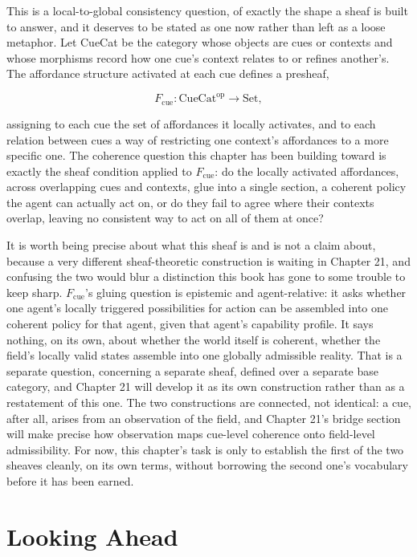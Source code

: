 This is a local-to-global consistency question, of exactly the shape a sheaf is built to answer, and it deserves to be stated as one now rather than left as a loose metaphor. Let CueCat be the category whose objects are cues or contexts and whose morphisms record how one cue's context relates to or refines another's. The affordance structure activated at each cue defines a presheaf,

\[ F_{\mathrm{cue}} : \mathrm{CueCat}^{\mathrm{op}} \to \mathrm{Set}, \]

assigning to each cue the set of affordances it locally activates, and to each relation between cues a way of restricting one context's affordances to a more specific one. The coherence question this chapter has been building toward is exactly the sheaf condition applied to \(F_{\mathrm{cue}}\): do the locally activated affordances, across overlapping cues and contexts, glue into a single section, a coherent policy the agent can actually act on, or do they fail to agree where their contexts overlap, leaving no consistent way to act on all of them at once?

It is worth being precise about what this sheaf is and is not a claim about, because a very different sheaf-theoretic construction is waiting in Chapter 21, and confusing the two would blur a distinction this book has gone to some trouble to keep sharp. \(F_{\mathrm{cue}}\)'s gluing question is epistemic and agent-relative: it asks whether one agent's locally triggered possibilities for action can be assembled into one coherent policy for that agent, given that agent's capability profile. It says nothing, on its own, about whether the world itself is coherent, whether the field's locally valid states assemble into one globally admissible reality. That is a separate question, concerning a separate sheaf, defined over a separate base category, and Chapter 21 will develop it as its own construction rather than as a restatement of this one. The two constructions are connected, not identical: a cue, after all, arises from an observation of the field, and Chapter 21's bridge section will make precise how observation maps cue-level coherence onto field-level admissibility. For now, this chapter's task is only to establish the first of the two sheaves cleanly, on its own terms, without borrowing the second one's vocabulary before it has been earned.

\section{Looking Ahead}

